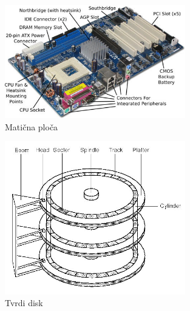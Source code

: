 \documentclass[croatian,t]{beamer} %
\begin{document}
    \begin{frame}
		\begin{figure}
			\includegraphics[width=0.7\textwidth]{../pics/motherboard-parts.jpg}
			\caption{Matična ploča}
		\end{figure}
    \end{frame}    

    \begin{frame}
		\begin{figure}
			\includegraphics[width=0.7\textwidth]{../pics/harddisk.jpg}
			\caption{Tvrdi disk}
		\end{figure}
    \end{frame}    
    
\end{document}
